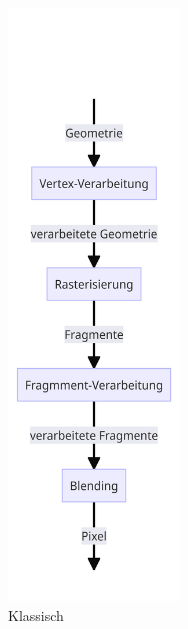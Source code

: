     \begin{figure}[ht!]
        \begin{subfigure}{0.5\textwidth}
            \centering
            \includegraphics[width=0.5\textwidth]{../assets/img/classic_render_pipline}
            \caption{Klassisch~\autocite{visualcomputingwh-2023}}
            \label{subfig:render-pipeline-classic}
        \end{subfigure}%
        \begin{subfigure}{0.5\textwidth}
            \centering

\end{subfigure}
\end{figure}
